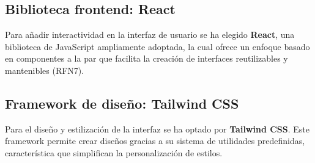 \subsection{Biblioteca frontend: React}

Para añadir interactividad en la interfaz de usuario se ha elegido \textbf{React}, una biblioteca de JavaScript ampliamente adoptada, la cual ofrece un enfoque basado en componentes a la par que facilita la creación de interfaces reutilizables y mantenibles (RFN7).

\subsection{Framework de diseño: Tailwind CSS}

Para el diseño y estilización de la interfaz se ha optado por \textbf{Tailwind CSS}. Este framework permite crear diseños gracias a su sistema de utilidades predefinidas, característica que simplifican la personalización de estilos.




